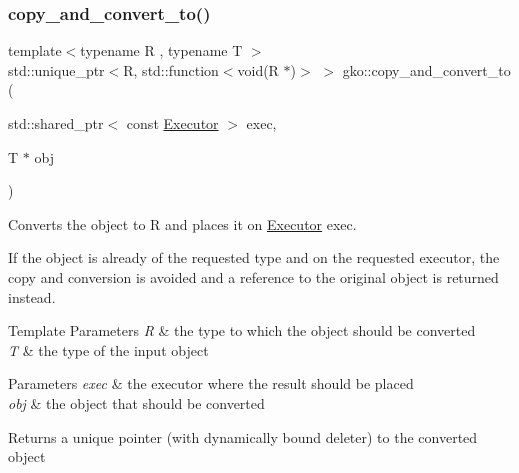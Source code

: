 \subsubsection{\texorpdfstring{copy\+\_\+and\+\_\+convert\+\_\+to()}{copy\_and\_convert\_to()}\hspace{0.1cm}{\footnotesize\ttfamily [1/2]}}
{\footnotesize\ttfamily template$<$typename R , typename T $>$ \\
std\+::unique\+\_\+ptr$<$R, std\+::function$<$void(R $\ast$)$>$ $>$ gko\+::copy\+\_\+and\+\_\+convert\+\_\+to (\begin{DoxyParamCaption}\item[{std\+::shared\+\_\+ptr$<$ const \hyperlink{classgko_1_1Executor}{Executor} $>$}]{exec,  }\item[{T $\ast$}]{obj }\end{DoxyParamCaption})}



Converts the object to R and places it on \hyperlink{classgko_1_1Executor}{Executor} exec. 

If the object is already of the requested type and on the requested executor, the copy and conversion is avoided and a reference to the original object is returned instead.


\begin{DoxyTemplParams}{Template Parameters}
{\em R} & the type to which the object should be converted \\
\hline
{\em T} & the type of the input object\\
\hline
\end{DoxyTemplParams}

\begin{DoxyParams}{Parameters}
{\em exec} & the executor where the result should be placed \\
\hline
{\em obj} & the object that should be converted\\
\hline
\end{DoxyParams}
\begin{DoxyReturn}{Returns}
a unique pointer (with dynamically bound deleter) to the converted object 
\end{DoxyReturn}
\mbox{\label{namespacegko_add859060efaa729c84788bb4f6582e9f}} 
